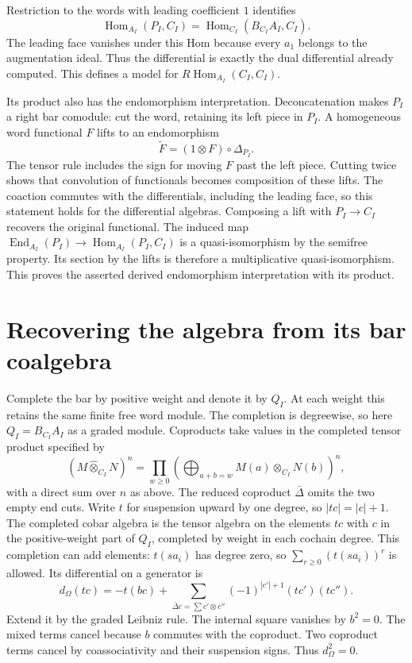 Restriction to the words with leading coefficient $1$ identifies
\[
 \operatorname{Hom}_{A_I}(P_I,C_I)
 =\operatorname{Hom}_{C_I}(B_{C_I}A_I,C_I).
\]
The leading face vanishes under this Hom because every $a_1$
belongs to the augmentation ideal.
Thus the differential is exactly the dual differential already
computed. This defines a model for
$R\operatorname{Hom}_{A_I}(C_I,C_I)$.

Its product also has the endomorphism interpretation.
Deconcatenation makes $P_I$ a right bar comodule: cut the word,
retaining its left piece in $P_I$.
A homogeneous word functional $F$ lifts to an endomorphism
\[
 \widetilde F=(1\otimes F)\circ\Delta_{P_I}.
\]
The tensor rule includes the sign for moving $F$ past the left
piece. Cutting twice shows that convolution of functionals
becomes composition of these lifts.
The coaction commutes with the differentials, including the
leading face, so this statement holds for the differential algebras.
Composing a lift with $P_I\to C_I$ recovers the original functional.
The induced map
$\operatorname{End}_{A_I}(P_I)\to
\operatorname{Hom}_{A_I}(P_I,C_I)$
is a quasi-isomorphism by the semifree property.
Its section by the lifts is therefore a multiplicative
quasi-isomorphism. This proves the asserted derived endomorphism
interpretation with its product.

\section{Recovering the algebra from its bar coalgebra}

Complete the bar by positive weight and denote it by $Q_I$.
At each weight this retains the same finite free word module.
The completion is degreewise, so here $Q_I=B_{C_I}A_I$ as a
graded module. Coproducts take values in the completed tensor product
specified by
\[
 (M\widehat\otimes_{C_I}N)^n
 =\prod_{w\ge0}\left(
   \bigoplus_{a+b=w}M(a)\otimes_{C_I}N(b)
   \right)^n,
\]
with a direct sum over $n$ as above.
The reduced coproduct $\bar\Delta$ omits the two empty end cuts.
Write $t$ for suspension upward by one degree, so $|tc|=|c|+1$.
The completed cobar algebra is the tensor algebra on the elements
$tc$ with $c$ in the positive-weight part of $Q_I$, completed by
weight in each cochain degree. This completion can add elements:
$t(sa_i)$ has degree zero, so $\sum_{r\ge0}(t(sa_i))^r$ is
allowed. Its differential on a generator is
\[
 d_\Omega(tc)=-t(bc)
 +\sum_{\bar\Delta c=\sum c'\otimes c''}
       (-1)^{|c'|+1}(tc')(tc'').
\]
Extend it by the graded Leibniz rule.
The internal square vanishes by $b^2=0$.
The mixed terms cancel because $b$ commutes with the coproduct.
Two coproduct terms cancel by coassociativity and their suspension
signs. Thus $d_\Omega^2=0$.

